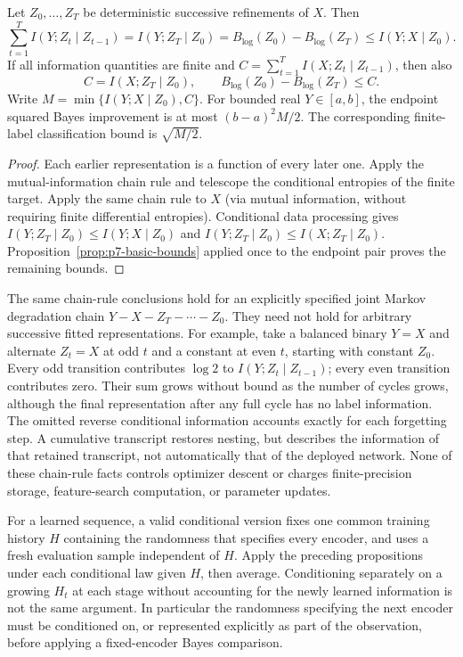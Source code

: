 \begin{proposition}
\label{prop:p7-chain-budget}
Let $Z_0,\ldots,Z_T$ be deterministic successive refinements of $X$.
Then
\[
 \sum_{t=1}^T I(Y;Z_t\mid Z_{t-1})
 = I(Y;Z_T\mid Z_0)
 = B_{\log}(Z_0)-B_{\log}(Z_T)
 \le I(Y;X\mid Z_0).
\]
If all information quantities are finite and
$C=\sum_{t=1}^T I(X;Z_t\mid Z_{t-1})$, then also
\[
 C=I(X;Z_T\mid Z_0),\qquad
 B_{\log}(Z_0)-B_{\log}(Z_T)\le C.
\]
Write $M=\min\{I(Y;X\mid Z_0),C\}$. For bounded real
$Y\in[a,b]$, the endpoint squared Bayes improvement is at most
$(b-a)^2M/2$. The corresponding finite-label classification bound is
$\sqrt{M/2}$.
\end{proposition}
\begin{proof}
Each earlier representation is a function of every later one. Apply the
mutual-information chain rule and telescope the conditional entropies
of the finite target. Apply the same chain rule to $X$ (via mutual
information, without requiring finite differential entropies).
Conditional data processing gives
$I(Y;Z_T\mid Z_0)\le I(Y;X\mid Z_0)$ and
$I(Y;Z_T\mid Z_0)\le I(X;Z_T\mid Z_0)$.
Proposition~\ref{prop:p7-basic-bounds} applied once to the endpoint pair
proves the remaining bounds.
\end{proof}

The same chain-rule conclusions hold for an explicitly specified joint
Markov degradation chain $Y-X-Z_T-\cdots-Z_0$. They need not hold for
arbitrary successive fitted representations. For example, take a balanced
binary $Y=X$ and alternate $Z_t=X$ at odd $t$ and a constant at even $t$,
starting with constant $Z_0$. Every odd transition contributes $\log2$
to $I(Y;Z_t\mid Z_{t-1})$; every even transition contributes zero.
Their sum grows without bound as the number of cycles grows, although
the final representation after any full cycle has no label information.
The omitted reverse conditional information accounts exactly for each
forgetting step. A cumulative transcript restores nesting, but describes
the information of that retained transcript, not automatically that of
the deployed network. None of these chain-rule facts controls optimizer
descent or charges finite-precision storage, feature-search computation,
or parameter updates.

For a learned sequence, a valid conditional version fixes one common
training history $H$ containing the randomness that specifies every
encoder, and uses a fresh evaluation sample independent of $H$.
Apply the preceding propositions under each conditional law given $H$,
then average. Conditioning separately on a growing $H_t$ at each stage
without accounting for the newly learned information is not the same
argument. In particular the randomness specifying the next encoder
must be conditioned on, or represented explicitly as part of the
observation, before applying a fixed-encoder Bayes comparison.
